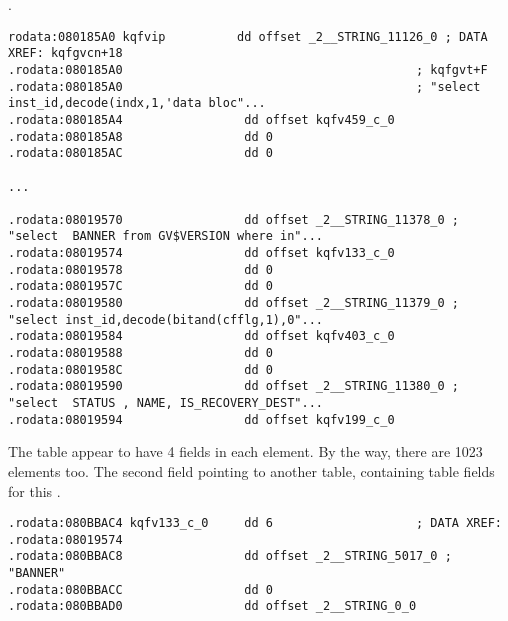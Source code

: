 .\begin{lstlisting}[caption=kqf.o]
rodata:080185A0 kqfvip          dd offset _2__STRING_11126_0 ; DATA XREF: kqfgvcn+18
.rodata:080185A0                                         ; kqfgvt+F
.rodata:080185A0                                         ; "select inst_id,decode(indx,1,'data bloc"...
.rodata:080185A4                 dd offset kqfv459_c_0
.rodata:080185A8                 dd 0
.rodata:080185AC                 dd 0

...

.rodata:08019570                 dd offset _2__STRING_11378_0 ; "select  BANNER from GV$VERSION where in"...
.rodata:08019574                 dd offset kqfv133_c_0
.rodata:08019578                 dd 0
.rodata:0801957C                 dd 0
.rodata:08019580                 dd offset _2__STRING_11379_0 ; "select inst_id,decode(bitand(cfflg,1),0"...
.rodata:08019584                 dd offset kqfv403_c_0
.rodata:08019588                 dd 0
.rodata:0801958C                 dd 0
.rodata:08019590                 dd offset _2__STRING_11380_0 ; "select  STATUS , NAME, IS_RECOVERY_DEST"...
.rodata:08019594                 dd offset kqfv199_c_0
\end{lstlisting}

{The table appear to have 4 fields in each element.
By the way, there are 1023 elements too.}
{The second field pointing to another table, containing table fields for this .}

\begin{lstlisting}[caption=kqf.o]
.rodata:080BBAC4 kqfv133_c_0     dd 6                    ; DATA XREF: .rodata:08019574
.rodata:080BBAC8                 dd offset _2__STRING_5017_0 ; "BANNER"
.rodata:080BBACC                 dd 0
.rodata:080BBAD0                 dd offset _2__STRING_0_0
\end{lstlisting}


